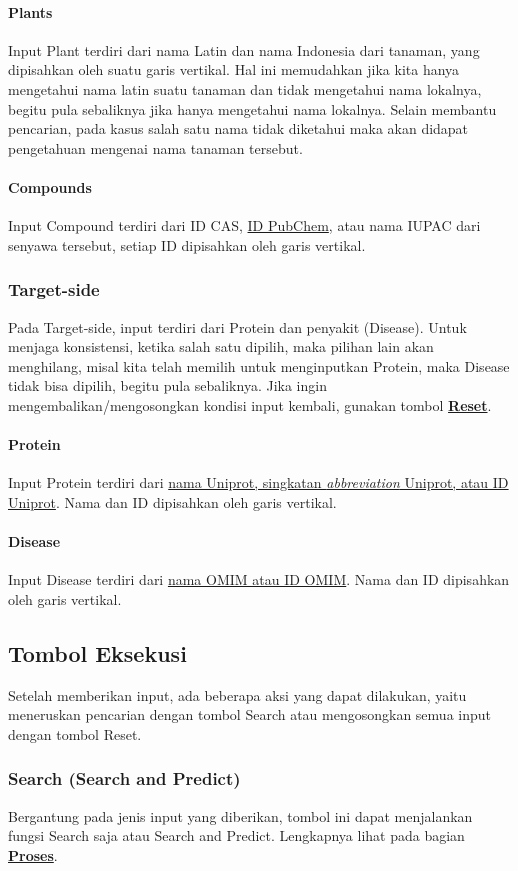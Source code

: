 			\paragraph{Plants}
			Input Plant terdiri dari nama Latin dan nama Indonesia dari tanaman, yang dipisahkan oleh suatu garis vertikal. Hal ini memudahkan jika kita hanya mengetahui nama latin suatu tanaman dan tidak mengetahui nama lokalnya, begitu pula sebaliknya jika hanya mengetahui nama lokalnya. Selain membantu pencarian, pada kasus salah satu nama tidak diketahui maka akan didapat pengetahuan mengenai nama tanaman tersebut.
			\paragraph{Compounds}
			Input Compound terdiri dari ID CAS, \hyperref[pubchem]{ID PubChem}, atau nama IUPAC dari senyawa tersebut, setiap ID dipisahkan oleh garis vertikal.
		\subsubsection{Target-side} \label{sssec:target input}
		Pada Target-side, input terdiri dari Protein dan penyakit (Disease). Untuk menjaga konsistensi, ketika salah satu dipilih, maka pilihan lain akan menghilang, misal kita telah memilih untuk menginputkan Protein, maka Disease tidak bisa dipilih, begitu pula sebaliknya. Jika ingin mengembalikan/mengosongkan kondisi input kembali, gunakan tombol \hyperref[reset]{\textbf{Reset}}.
			\paragraph{Protein}
			Input Protein terdiri dari \hyperref[uniprot]{nama Uniprot, singkatan \emph{abbreviation} Uniprot, atau ID Uniprot}. Nama dan ID dipisahkan oleh garis vertikal.
			\paragraph{Disease}
			Input Disease terdiri dari \hyperref[omim]{nama OMIM atau ID OMIM}. Nama dan ID dipisahkan oleh garis vertikal.

	\subsection{Tombol Eksekusi}
	Setelah memberikan input, ada beberapa aksi yang dapat dilakukan, yaitu meneruskan pencarian dengan tombol Search atau mengosongkan semua input dengan tombol Reset.
		\subsubsection{Search (Search and Predict)} \label{sssec:search}
		Bergantung pada jenis input yang diberikan, tombol ini dapat menjalankan fungsi Search saja atau Search and Predict. Lengkapnya lihat pada bagian \hyperref[process]{\textbf{Proses}}.
